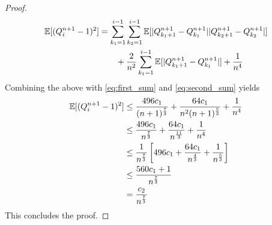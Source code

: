 \begin{lemma}
\begin{proof}
\begin{align*}
		\mathbb{E}[(Q_i^{n+1} - 1)^2] &= \sum_{k_1=1}^{i-1}\sum_{k_2=1}^{i-1}\mathbb{E}[\lvert Q_{k_1+1}^{n+1} - Q_{k_1}^{n+1}\rvert\lvert Q_{k_2+1}^{n+1} - Q_{k_2}^{n+1}\rvert]\\
		&\qquad + \frac{2}{n^2} \sum_{k_1=1}^{i-1}\mathbb{E}[|Q_{k_1+1}^{n+1} - Q_{k_1}^{n+1}|] + \frac{1}{n^4}
		\end{align*}
		Combining the above with \eqref{eq:first_sum} and \eqref{eq:second_sum} yields
		\begin{align*}
		\mathbb{E}[(Q_i^{n+1} - 1)^2] &\leq \frac{496c_1}{(n+1)^\frac{7}{3}}+ \frac{64c_1}{n^2(n+1)^\frac{5}{3}} + \frac{1}{n^4}\\
		&\leq \frac{496c_1}{n^\frac{7}{3}} + \frac{64c_1}{n^\frac{11}{3}} + \frac{1}{n^4}\\
		&\leq \frac{1}{n^\frac{7}{3}}\left[496c_1 + \frac{64c_1}{n^\frac{4}{3}} + \frac{1}{n^\frac{5}{3}}\right]\\
		&\leq \frac{560c_1+1}{n^\frac{7}{3}}\\
		&= \frac{c_2}{n^\frac{7}{3}}
		\end{align*}
		This concludes the proof.
	\end{proof}
\end{lemma}
%
%
%
